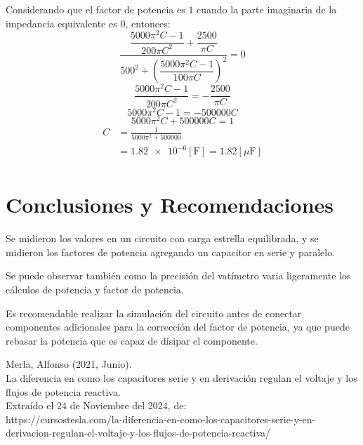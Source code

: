 \documentclass[letter,11pt]{article}
\begin{document}
\begin{enumerate}
Considerando que el factor de potencia es $1$ cuando la parte imaginaria de la
impedancia equivalente es $0$, entonces:
\begin{equation*}
    \dfrac{\dfrac{5000\pi^2{C}-1}{200\pi{C^2}}+\dfrac{2500}{\pi{C}}}
    {500^2+\left(\dfrac{5000\pi^2{C}-1}{100\pi{C}}\right)^2}=0
\end{equation*}
\begin{equation*}
    \frac{5000\pi^2{C}-1}{200\pi{C^2}}=-\frac{2500}{\pi{C}}
\end{equation*}
\begin{equation*}
    5000\pi^2{C}-1=-500000{C}
\end{equation*}
\begin{equation*}
    5000\pi^2{C}+500000{C}=1
\end{equation*}
\begin{equation*}
    \begin{split}
        C &= \frac{1}{5000\pi^2+500000}\\
          &= \num{1.82e-6}[\text{F}] = 1.82[\mu\text{F}]\\
    \end{split}
\end{equation*}

\end{enumerate}

\section{Conclusiones y Recomendaciones}
Se midieron los valores en un circuito con carga estrella equilibrada, y se
midieron los factores de potencia agregando un capacitor en serie y paralelo.

Se puede observar también como la precisión del vatímetro varia ligeramente los
cálculos de potencia y factor de potencia.

Es recomendable realizar la simulación del circuito antes de conectar
componentes adicionales para la corrección del factor de potencia, ya que puede
rebasar la potencia que es capaz de disipar el componente.

\begin{thebibliography}{99}

 Merla, Alfonso (2021, Junio).\\
La diferencia en como los capacitores serie y en derivación regulan el voltaje
y los flujos de potencia reactiva.\\
Extraído el 24 de Noviembre del 2024, de:\\
https://cursostesla.com/la-diferencia-en-como-los-capacitores-serie-y-en-derivacion-regulan-el-voltaje-y-los-flujos-de-potencia-reactiva/

\end{thebibliography}
\end{document}
